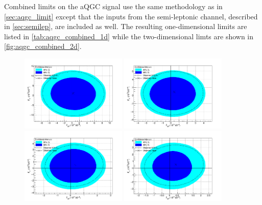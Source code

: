 Combined limits on the aQGC signal use the same methodology
as in \sec\ref{sec:aqgc_limit} except that the inputs from the semi-leptonic
channel, described in \sec\ref{sec:semilep}, are included as well.
The resulting one-dimensional limits are listed in \tab\ref{tab:aqgc_combined_1d}
while the two-dimensional limts are shown in \fig\ref{fig:aqgc_combined_2d}.


\begin{figure}[h!]
\begin{center}

\includegraphics[width=0.45\textwidth]{figures/combination/Comb500-Lim.png}
\includegraphics[width=0.45\textwidth]{figures/combination/Comb100-Lim.png}\\
\includegraphics[width=0.45\textwidth]{figures/combination/Comb200-Lim.png}
\includegraphics[width=0.45\textwidth]{figures/combination/Comb300-Lim.png}\\

\end{center}
\end{figure}
